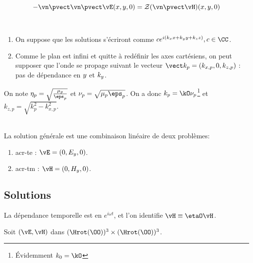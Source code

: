 \begin{equation}
\label{eq:coeff_ref:intro:ci}
-\vn \pvect \vn \pvect \vE(\x,\y,0) = \mathcal{Z}( \vn \pvect \vH)(\x,\y,0)
\end{equation}

\begin{hyp}{}~\\
\begin{enumerate}
    \item On suppose que les solutions s'écriront comme \(c e^{i(k_\x\x +k_\y\y+k_\z\z)}, c\in\CC\).
    \item Comme le plan est infini et quitte à redéfinir les axes cartésiens, on peut supposer que l'onde se propage suivant le vecteur \(\vect k_p = (k_{\x,p},0,k_{\z,p})\) : pas de dépendance en \({y}\) et \(k_{y}\).
\end{enumerate}
\end{hyp}

On note \(\eta_p = \sqrt{\frac{\mu_p}{\eps_p}}\) et \(\nu_p = \sqrt{\mu_p \eps_p}\).
On a donc \(k_p = \kO\nu_p\)\footnote{Évidemment \(k_0 = \kO\)} et \(k_{z,p} = \sqrt{k_p^2 - k_{x,p}^2}\).

\begin{hyp}{}~\\
La solution générale est une combinaison linéaire de deux problèmes:
\begin{enumerate}
    \item \gls{acr-te} : \(\vE = (0,E_y,0)\).
    \item \gls{acr-tm} : \(\vH = (0,H_y,0)\).
\end{enumerate}
\end{hyp}

\subsection{Solutions}

\begin{tcolorbox}
\centering
La dépendance temporelle est en \(e^{i \omega t}\), et l'on identifie \(\vH \equiv \etaO \vH\).
\end{tcolorbox}


Soit \((\vE,\vH)\) dans \((\Hrot(\OO))^3 \times (\Hrot(\OO))^3\).

